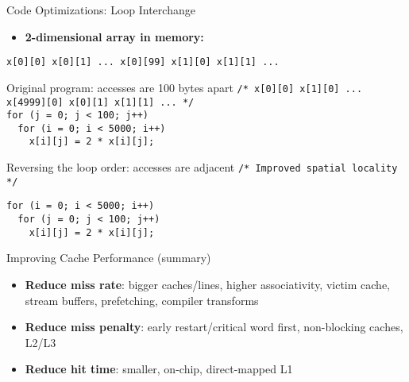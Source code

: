 \documentclass[aspectratio=169,12pt]{beamer}
\begin{document}
\begin{frame}[fragile]{Code Optimizations: Loop Interchange}
\begin{itemize}
  \item \textbf{2-dimensional array in memory:}
\end{itemize}

\small
\texttt{x[0][0] x[0][1] ... x[0][99] x[1][0] x[1][1] ...}

\vspace{0.3cm}
\begin{block}{Original program: accesses are 100 bytes apart}
\small
\texttt{/* x[0][0] x[1][0] ... x[4999][0] x[0][1] x[1][1] ... */}\\
\texttt{for (j = 0; j < 100; j++)}\\
\texttt{~~for (i = 0; i < 5000; i++)}\\
\texttt{~~~~x[i][j] = 2 * x[i][j];}
\end{block}

\vspace{0.2cm}
\begin{block}{Reversing the loop order: accesses are adjacent}
\small
\texttt{/* Improved spatial locality */}\\
\texttt{for (i = 0; i < 5000; i++)}\\
\texttt{~~for (j = 0; j < 100; j++)}\\
\texttt{~~~~x[i][j] = 2 * x[i][j];}
\end{block}
\end{frame}

\begin{frame}{Improving Cache Performance (summary)}
\begin{itemize}
  \item \textbf{Reduce miss rate}: bigger caches/lines, higher associativity, victim cache, stream buffers, prefetching, compiler transforms
  \item \textbf{Reduce miss penalty}: early restart/critical word first, non-blocking caches, L2/L3
  \item \textbf{Reduce hit time}: smaller, on-chip, direct-mapped L1
\end{itemize}
\end{frame}
\end{document}
